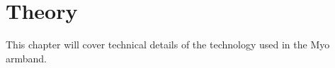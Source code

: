 \chapter{Theory}
\label{chap:theory}
This chapter will cover technical details of the technology used in the Myo armband.



